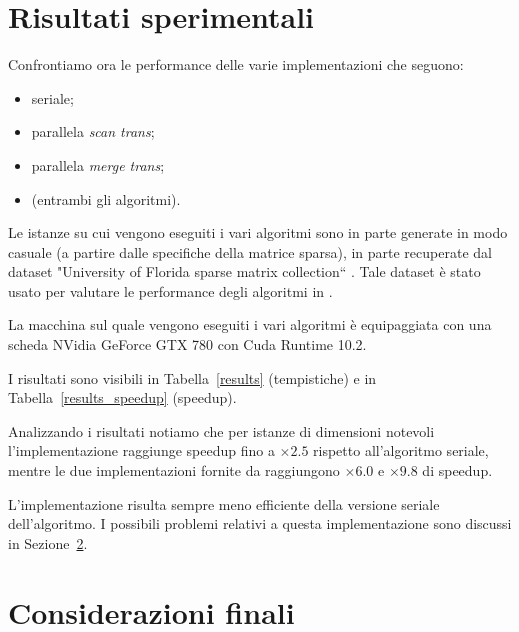 

\section{Risultati sperimentali}

Confrontiamo ora le performance delle varie implementazioni che seguono:
\begin{itemize}
    \item seriale;
    \item parallela \emph{scan trans};
    \item parallela \emph{merge trans};
    \item \cuSPARSE{} (entrambi gli algoritmi).
\end{itemize}

Le istanze su cui vengono eseguiti i vari algoritmi sono in parte generate in modo casuale (a partire dalle specifiche della matrice sparsa), in parte recuperate dal dataset "University  of Florida sparse  matrix collection`` \cite{dataset}. Tale dataset è stato usato per valutare le performance degli algoritmi in \cite{parallelTrans}.

La macchina sul quale vengono eseguiti i vari algoritmi è equipaggiata con una scheda NVidia GeForce GTX 780 con Cuda Runtime 10.2.

I risultati sono visibili in Tabella~\ref{results} (tempistiche) e in Tabella~\ref{results_speedup} (speedup).

Analizzando i risultati notiamo che per istanze di dimensioni notevoli l'implementazione \ScanTrans{} raggiunge speedup fino a $\times 2.5$ rispetto all'algoritmo seriale, mentre le due implementazioni fornite da \cuSPARSE{} raggiungono $\times 6.0$ e $\times 9.8$ di speedup. 

L'implementazione \MergeTrans{} risulta sempre meno efficiente della versione seriale dell'algoritmo. I possibili problemi relativi a questa implementazione sono discussi in Sezione~\ref{conclusioni}.





\section{Considerazioni finali}\label{conclusioni}

